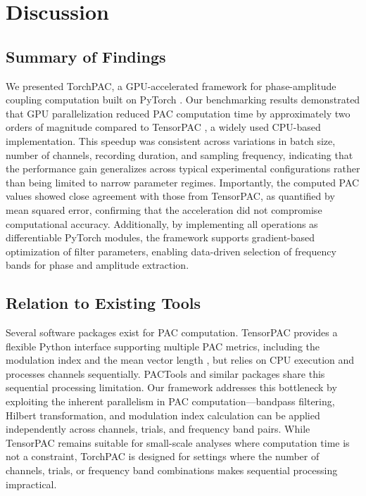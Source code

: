 
\section{Discussion}

\subsection{Summary of Findings}
We presented TorchPAC, a GPU-accelerated framework for phase-amplitude coupling computation built on PyTorch \cite{paszke_pytorch_2019}. Our benchmarking results demonstrated that GPU parallelization reduced PAC computation time by approximately two orders of magnitude compared to TensorPAC \cite{combrisson_tensorpac_2020}, a widely used CPU-based implementation. This speedup was consistent across variations in batch size, number of channels, recording duration, and sampling frequency, indicating that the performance gain generalizes across typical experimental configurations rather than being limited to narrow parameter regimes. Importantly, the computed PAC values showed close agreement with those from TensorPAC, as quantified by mean squared error, confirming that the acceleration did not compromise computational accuracy. Additionally, by implementing all operations as differentiable PyTorch modules, the framework supports gradient-based optimization of filter parameters, enabling data-driven selection of frequency bands for phase and amplitude extraction.

\subsection{Relation to Existing Tools}
Several software packages exist for PAC computation. TensorPAC \cite{combrisson_tensorpac_2020} provides a flexible Python interface supporting multiple PAC metrics, including the modulation index \cite{tort_measuring_2010} and the mean vector length \cite{canolty_high_2006}, but relies on CPU execution and processes channels sequentially. PACTools and similar packages share this sequential processing limitation. Our framework addresses this bottleneck by exploiting the inherent parallelism in PAC computation---bandpass filtering, Hilbert transformation, and modulation index calculation can be applied independently across channels, trials, and frequency band pairs. While TensorPAC remains suitable for small-scale analyses where computation time is not a constraint, TorchPAC is designed for settings where the number of channels, trials, or frequency band combinations makes sequential processing impractical.

